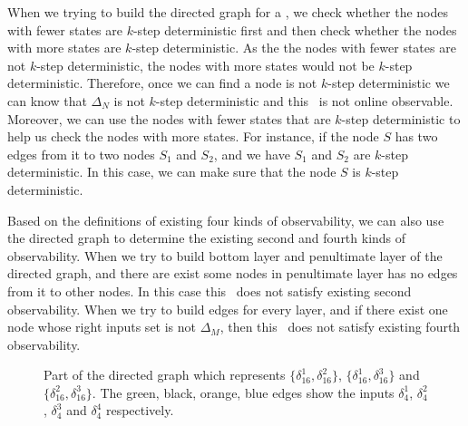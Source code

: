 When we trying to build the directed graph for a \BCN, we check whether the nodes with fewer states are $k$-step deterministic first and then check whether the nodes with more states are $k$-step deterministic.  As the the nodes with fewer states are not $k$-step deterministic, the nodes with more states would not be $k$-step deterministic. Therefore, once we can find a node is not $k$-step deterministic we can know that $\Delta_N$ is not $k$-step deterministic and this \BCN\ is not online observable. Moreover, we can use the nodes with fewer states that are $k$-step deterministic to help us check the nodes with more states. For instance, if the node $S$ has two edges from it to two nodes $S_1$ and $S_2$, and we have $S_1$ and $S_2$ are $k$-step deterministic. In this case, we can make sure that the node $S$ is $k$-step deterministic.

Based on the definitions of existing four kinds of observability, we can also use the directed graph to determine the existing second and fourth kinds of observability. When we try to build bottom layer and penultimate layer of the directed graph, and there are exist some nodes in penultimate layer has no edges from it to other nodes. In this case this \BCN\ does not satisfy existing second observability. When we try to build edges for every layer, and if there exist one node whose right inputs set is not $\Delta_M$, then this \BCN\ does not satisfy existing fourth observability.
\begin{figure}[thpb]
      \centering
      
      \caption{Part of the directed graph which represents $\{\delta_{16}^1,\delta_{16}^2\}$, $\{\delta_{16}^1,\delta_{16}^3\}$ and $\{\delta_{16}^2,\delta_{16}^3\}$. The green, black, orange, blue edges show the inputs $\delta_4^1$, $\delta_4^2$, $\delta_4^3$ and $\delta_4^4$ respectively.}
      \label{fig:4}
   \end{figure}
